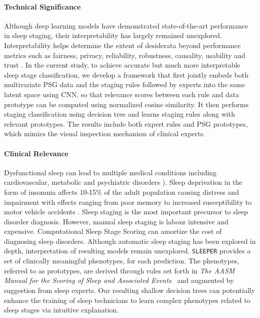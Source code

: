 \documentclass[pmlr]{jmlr}
\newcommand{\mname}
{\texttt{SLEEPER}\xspace}
\begin{document}
\paragraph{Technical Significance}
Although deep learning models have demonstrated state-of-the-art performance in sleep staging, their interpretability has largely remained unexplored. Interpretability helps determine the extent of desiderata beyond performance metrics such as fairness, privacy, reliability, robustness, causality, usability and trust \citep{doshi2017towards}. In the current study, to achieve accurate but much more interpretable sleep stage classification, we develop a framework that first jointly embeds both multivariate PSG data and the staging rules followed by experts into the same latent space using CNN, so that relevance scores between each rule and data prototype can be computed using normalized cosine similarity. 
It then performs staging classification using decision tree and learns staging rules along with relevant prototypes. The results include both expert rules and PSG prototypes, which mimics the visual inspection mechanism of clinical experts. 





\paragraph{Clinical Relevance}
Dysfunctional sleep can lead to multiple medical conditions including cardiovascular, metabolic and psychiatric disorders \citep{nature}). Sleep deprivation in the form of insomnia affects 10-15\%  of the adult population causing distress and impairment \citep{insomnia_percentage} with effects ranging from poor memory to increased susceptibility to motor vehicle accidents \citep{accident}. Sleep staging is the most important precursor to sleep disorder diagnosis. However, manual sleep staging is labour intensive and expensive. Computational Sleep Stage Scoring can amortize the cost of diagnosing sleep disorders. Although automatic sleep staging has been explored in depth, interpretation of resulting models remain unexplored. \mname provides a set of clinically meaningful phenotypes, for each prediction. The phenotypes, referred to as prototypes, are derived through rules set forth in \textit{The AASM Manual for the Scoring of Sleep and Associated Events}~\citep{berry2012aasm} and augmented by suggestion from sleep experts. Our resulting shallow decision trees can potentially enhance the training of sleep technicians to learn complex phenotypes related to sleep stages via intuitive explanation. 
\end{document}
